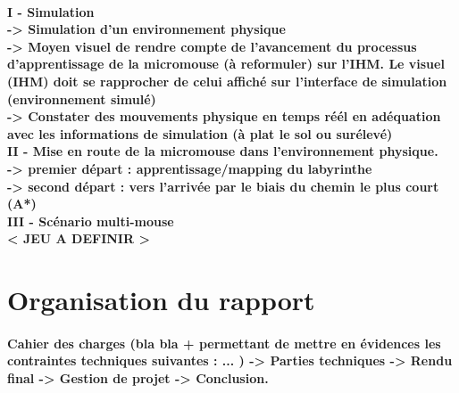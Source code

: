 \paragraph{
I - Simulation
\\ -> Simulation d'un environnement physique
\\ -> Moyen visuel de rendre compte de l'avancement du processus d'apprentissage de la micromouse (à reformuler) sur l'IHM. Le visuel (IHM) doit se rapprocher de celui affiché sur l'interface de simulation (environnement simulé)
\\ -> Constater des mouvements physique en temps réél en adéquation avec les informations de simulation (à plat le sol ou surélevé)
\\II - Mise en route de la micromouse dans l'environnement physique.
\\ -> premier départ : apprentissage/mapping du labyrinthe
\\ -> second départ : vers l'arrivée par le biais du chemin le plus court (A*)
\\ III - Scénario multi-mouse
\\ < JEU A DEFINIR >
}

\section{Organisation du rapport}
\label{sec:introduction_organisation_du_rapport}

\paragraph{
Cahier des charges (bla bla + permettant de mettre en évidences les contraintes techniques suivantes : ... ) -> Parties techniques -> Rendu final -> Gestion de projet -> Conclusion.
}